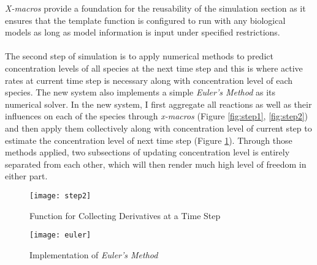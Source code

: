 \documentclass[../thesis.tex]{subfiles}
\begin{document}
 \textit{X-macros} provide a foundation for the reusability of the simulation section as it ensures that the template function is configured to run with any biological models as long as model information is input under specified restrictions.\\
\\
The second step of simulation is to apply numerical methods to predict concentration levels of all species at the next time step and this is where active rates at current time step is necessary along with concentration level of each species. The new system also implements a simple \textit{Euler's Method} as its numerical solver. In the new system, I first aggregate all reactions as well as their influences on each of the species through \textit{x-macros}  (Figure \ref{fig:step1}, \ref{fig:step2}) and then apply them collectively along with concentration level of current step to estimate the concentration level of next time step (Figure \ref{fig:euler}). Through those methods applied, two subsections of updating concentration level is entirely separated from each other, which will then render much high level of freedom in either part.

 \begin{figure}[h]
\centering
\texttt{[image: step2]}
\caption{Function for Collecting Derivatives at a Time Step}
\label{fig:step2}
\texttt{[image: euler]}
\caption{Implementation of \textit{Euler's Method}}
\label{fig:euler}
\end{figure}
\end{document}
